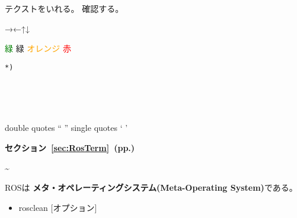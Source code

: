 \setcounter{num}{0}

\vspace{\baselineskip}
\noindent
{}
\thenum


\setcounter{num}{0}
\vspace{\baselineskip}
\noindent
{}\circled{\thenum} テクストをいれる。
\circled{\thenum} 確認する。


→←↑↓

\textcolor{green}{緑}
{\color{limegreen}緑}
\textcolor{orange}{オレンジ}
\textcolor{red}{赤}


\vspace{\baselineskip}
\begin{lstlisting}[language=ROS]
%*
*)
\end{lstlisting}

\begin{lstlisting}[language=C++]
\end{lstlisting}
\begin{lstlisting}[language=bash]
\end{lstlisting}
\begin{lstlisting}[language=XML]
\end{lstlisting}
\begin{lstlisting}[language=make]
\end{lstlisting}
\begin{lstlisting}[language=YAML]
\end{lstlisting}


\textbf{}

double quotes
`` ''
single quotes
` '

\begin{exercise}[ROSシェルコマンドを使用できる環境]
\end{exercise}

\setcounter{num}{0}

\circled{\thenum}

\cite{book_key}

\textbf{セクション~\ref{sec:RosTerm}~(pp.\pageref{sec:RosTerm})}

\textasciitilde

\begin{center}
ROSは \textbf{メタ・オペレーティングシステム(Meta-Operating System)}である。
\end{center}

\begin{itemize}
\item  rosclean [オプション]
\end{itemize}

